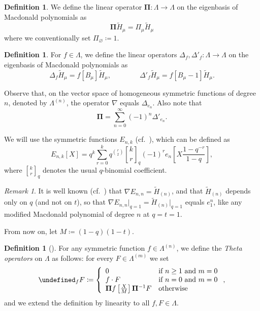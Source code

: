 \documentclass[reqno]{amsart}
\theoremstyle{plain}
\theoremstyle{definition}
\newtheorem{definition}[theorem]{Definition}
\theoremstyle{remark}
\newtheorem{remark}[theorem]{Remark}
\newcommand{\Ht}{\widetilde{H}}
\let\oldTheta\Theta
\let\Theta\undefined
\DeclareMathOperator{\Theta}{\oldTheta}
\newcommand{\qbinom}[3][q]{\genfrac{[}{]}{0pt}{}{#2}{#3}_{#1}}
\newcommand{\<}{\langle}
\renewcommand{\>}{\rangle}
\begin{document}
\begin{definition}
    \label{def:pi}
    We define the linear operator $\mathbf{\Pi} \colon \Lambda \rightarrow \Lambda$ on the eigenbasis of Macdonald polynomials as \[ \mathbf{\Pi} \Ht_\mu = \Pi_\mu \Ht_\mu \] where we conventionally set $\Pi_{\varnothing} \coloneqq 1$.
\end{definition}

\begin{definition}
    \label{def:delta}
    For $f \in \Lambda$, we define the linear operators $\Delta_f, \Delta'_f \colon \Lambda \rightarrow \Lambda$ on the eigenbasis of Macdonald polynomials as \[ \Delta_f \Ht_\mu = f[B_\mu] \Ht_\mu, \qquad \qquad \Delta'_f \Ht_\mu = f[B_\mu-1] \Ht_\mu. \]
\end{definition}

Observe that, on the vector space of homogeneous symmetric functions of degree $n$, denoted by $\Lambda^{(n)}$, the operator $\nabla$ equals $\Delta_{e_n}$. Also note that \[ \mathbf{\Pi} = \sum_{n=0}^\infty (-1)^n \Delta'_{e_n}. \] 

We will use the symmetric functions $E_{n,k}$ (cf.\ \cite[Section~1.3]{DAdderioRomero2023ThetaIdentities}), which can be defined as
\[E_{n,k}[X]=q^k\sum_{r=0}^k q^{\binom{r}{2}} \qbinom{k}{r}(-1)^re_n\left[X\frac{1-q^{-r}}{1-q}\right],\]
where $\qbinom{k}{r}$ denotes the usual $q$-binomial coefficient.

\begin{remark}
    \label{rem:Enk}
    It is well known (cf.\ \cite[Theorem 7.4]{DAdderioRomero2023ThetaIdentities}) that $\nabla E_{n,n}=\widetilde{H}_{(n)}$, and that $\widetilde{H}_{(n)}$ depends only on $q$ (and not on $t$), so that $\nabla E_{n,n} \rvert_{q=1} = \widetilde{H}_{(n)} \rvert_{q=1}$ equals $e_1^n$, like any modified Macdonald polynomial of degree $n$ at $q=t=1$.
\end{remark}

From now on, let $M \coloneqq (1-q)(1-t)$.

\begin{definition}[{\cite[Equation~(28)]{DAdderioIraciVandenWyngaerd2021ThetaOperators}}]
    \label{def:theta}
    For any symmetric function $f \in \Lambda^{(n)}$, we define the \emph{Theta operators} on $\Lambda$ as follows: for every $F \in \Lambda^{(m)}$ we set
    \begin{equation*}
        \Theta_f F  \coloneqq
        \left\{\begin{array}{ll}
            0                                                           & \text{if } n \geq 1 \text{ and } m=0 \\
            f \cdot F                                                   & \text{if } n=0 \text{ and } m=0      \\
            \mathbf{\Pi} f \left[\frac{X}{M}\right] \mathbf{\Pi}^{-1} F & \text{otherwise}
        \end{array}
        \right. ,
    \end{equation*}
    and we extend the definition by linearity to all $f, F \in \Lambda$.
\end{definition}
\end{document}

